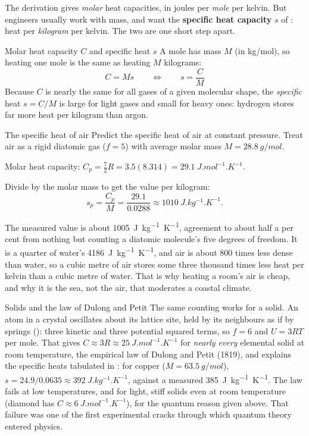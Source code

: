 The derivation gives \emph{molar} heat capacities, in joules per \emph{mole} per kelvin. But engineers
usually work with mass, and want the \textbf{specific heat capacity} $s$ of : heat per
\emph{kilogram} per kelvin. The two are one short step apart.

\begin{keybox}{Molar heat capacity $C$ and specific heat $s$}
A mole has mass $M$ (in \si{kg/mol}), so heating one mole is the same as heating $M$ kilograms:
\[
\boxed{\;C = M s \qquad\Longleftrightarrow\qquad s = \frac{C}{M}\;}
\]
Because $C$ is nearly the same for all gases of a given molecular shape, the \emph{specific} heat
$s = C/M$ is large for light gases and small for heavy ones: hydrogen stores far more heat per kilogram
than argon.
\end{keybox}

\begin{exbox}{The specific heat of air}\label{ex:ktair}
Predict the specific heat of air at constant pressure. Treat air as a rigid diatomic gas ($f=5$) with
average molar mass $M = \SI{28.8}{g/mol}$.

 Molar heat capacity: $C_p = \tfrac72 R = 3.5(8.314) = \SI{29.1}{J.mol^{-1}.K^{-1}}$.

 Divide by the molar mass to get the value per kilogram:
\[
s_p = \frac{C_p}{M} = \frac{29.1}{0.0288} \approx \SI{1010}{J.kg^{-1}.K^{-1}}.
\]

 The measured value is about \SI{1005}{J.kg^{-1}.K^{-1}}, agreement to about half a per cent from
nothing but counting a diatomic molecule's five degrees of freedom. It is a quarter of water's
\SI{4186}{J.kg^{-1}.K^{-1}}, and air is about 800 times less dense than water, so a cubic metre of air
stores some three thousand times less heat per kelvin than a cubic metre of water. That is why heating a
room's air is cheap, and why it is the sea, not the air, that moderates a coastal climate.
\end{exbox}

\begin{remarkbox}{Solids and the law of Dulong and Petit}
The same counting works for a solid. An atom in a crystal oscillates about its lattice site, held by its
neighbours as if by springs (): three kinetic and three potential squared terms, so
$f=6$ and $U = 3RT$ per mole. That gives $C \approx 3R \approx \SI{25}{J.mol^{-1}.K^{-1}}$ for
\emph{nearly every} elemental solid at room temperature, the empirical law of Dulong and Petit (1819), and
explains the specific heats tabulated in : for copper ($M=\SI{63.5}{g/mol}$),
$s=24.9/0.0635\approx\SI{392}{J.kg^{-1}.K^{-1}}$, against a measured \SI{385}{J.kg^{-1}.K^{-1}}. The law
fails at low temperatures, and for light, stiff solids even at room temperature (diamond has
$C\approx\SI{6}{J.mol^{-1}.K^{-1}}$), for the quantum reason given above. That failure was one of the
first experimental cracks through which quantum theory entered physics.
\end{remarkbox}

